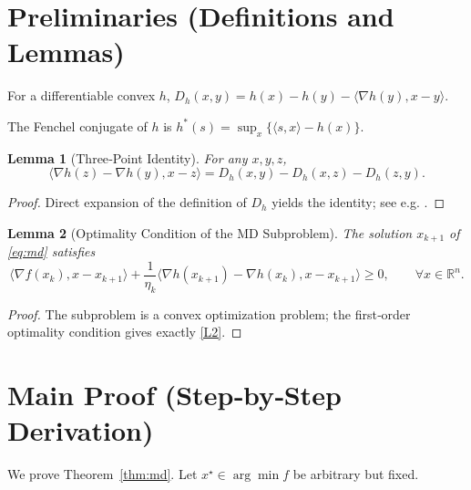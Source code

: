 \documentclass[11pt]{article}
\newtheorem{lemma}{Lemma}
\newcommand{\inner}[2]{\langle #1,#2\rangle}
\newcommand{\grad}{\nabla}
\newcommand{\D}{D}
\newcommand{\R}{\mathbb{R}}
\begin{document}
\section*{Preliminaries (Definitions and Lemmas)}
\begin{definition}
For a differentiable convex $h$, $\D_h(x,y)=h(x)-h(y)-\inner{\grad h(y)}{x-y}$.
\end{definition}
\begin{definition}
The Fenchel conjugate of $h$ is $h^{*}(s)=\sup_{x}\{\inner{s}{x}-h(x)\}$.
\end{definition}
\begin{lemma}[Three‑Point Identity]
\label{lem:3pt}
For any $x,y,z$,
\[
\inner{\grad h(z)-\grad h(y)}{x-z}= \D_h(x,y)-\D_h(x,z)-\D_h(z,y).
\tag{L1}
\]
\end{lemma}
\begin{proof}
Direct expansion of the definition of $\D_h$ yields the identity; see e.g. \cite{Beck2003}.
\end{proof}
\begin{lemma}[Optimality Condition of the MD Subproblem]
\label{lem:optcond}
The solution $x_{k+1}$ of \eqref{eq:md} satisfies
\[
\inner{\grad f(x_k)}{x-x_{k+1}}+\frac{1}{\eta_k}\inner{\grad h(x_{k+1})-\grad h(x_k)}{x-x_{k+1}}\ge0,
\qquad\forall x\in\R^{n}.
\tag{L2}
\]
\end{lemma}
\begin{proof}
The subproblem is a convex optimization problem; the first‑order optimality condition gives exactly \eqref{L2}.
\end{proof}

\section*{Main Proof (Step‑by‑Step Derivation)}
We prove Theorem~\ref{thm:md}. Let $x^{\star}\in\arg\min f$ be arbitrary but fixed.
\end{document}
